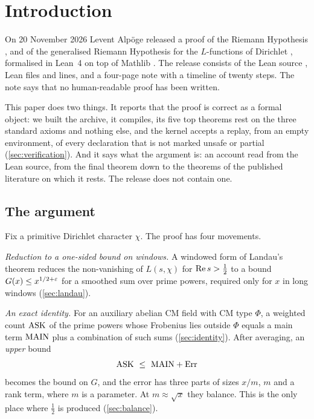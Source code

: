\section{Introduction}\label{sec:intro}

On 20 November 2026 Levent Alp\"oge released a proof of the Riemann Hypothesis
\cite{riemann1859anzahl}, and of the generalised Riemann Hypothesis for the $L$-functions of
Dirichlet \cite{dirichlet1837beweis}, formalised in Lean~4
\cite{demoura2021lean4} on top of Mathlib \cite{mathlib2020}. The release consists of the Lean
source \cite{alpoge2026lean}, \filecount{} Lean files and \linecount{} lines, and a four-page note
\cite{alpoge2026remark}
with a timeline of twenty steps. The note says that no human-readable proof has been written.

This paper does two things. It reports that the proof is correct as a formal object: we built
the archive, it compiles, its five top theorems rest on the three standard axioms and
nothing else, and the kernel accepts a replay, from an empty environment, of every declaration
that is not marked unsafe or partial (\cref{sec:verification}). And it says what the argument
is: an account read from the Lean source, from the final theorem down to the theorems of the
published literature on which it rests. The release does not contain one.

\subsection{The argument}
Fix a primitive Dirichlet character $\chi$. The proof has four movements.

\emph{Reduction to a one-sided bound on windows.} A windowed form of Landau's theorem reduces
the non-vanishing of $L(s,\chi)$ for $\operatorname{Re} s>\tfrac12$ to a bound $G(x)\le x^{1/2+\varepsilon}$ for a
smoothed sum over prime powers, required only for $x$ in long windows (\cref{sec:landau}).

\emph{An exact identity.} For an auxiliary abelian CM field with CM type $\Phi$, a weighted
count $\mathrm{ASK}$ of the prime powers whose Frobenius lies outside $\Phi$ equals a main term
$\mathrm{MAIN}$ plus a combination of such sums (\cref{sec:identity}). After averaging, an
\emph{upper} bound
\[
\ASK\ \le\ \MAIN+\Err
\]
becomes the bound on $G$, and the error has three parts of sizes $x/m$, $m$ and a rank term,
where $m$ is a parameter. At $m\approx\sqrt x$ they balance. This is the only place where
$\tfrac12$ is produced (\cref{sec:balance}).


